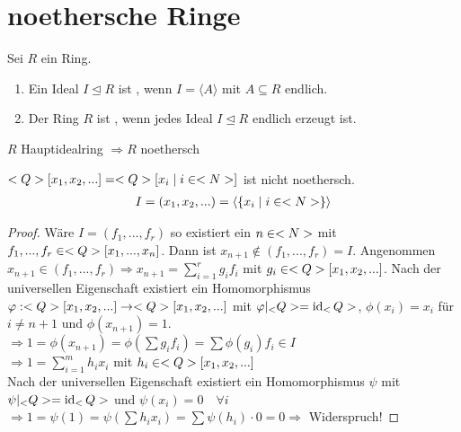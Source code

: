 \section{noethersche Ringe}

Sei $R$ ein Ring.

\begin{definition}
	\begin{enumerate}[label=(\alph*)]
		\item Ein Ideal $I\unlhd R$ ist , wenn $I=\langle A\rangle$ mit $A\subseteq R$ endlich.
		\item Der Ring $R$ ist , wenn jedes Ideal $I\unlhd R$ endlich erzeugt ist.
	\end{enumerate}
\end{definition}

\begin{example}
	$R$ Hauptidealring $\Rightarrow R$ noethersch
\end{example}

\begin{example}
	$<Q>[x_1,x_2,...] = <Q>[x_i\mid i\in<N>]$ ist nicht noethersch.
	\begin{align}
		I = (x_1,x_2,...) = \langle\{x_i\mid i\in<N> \}\rangle\notag
	\end{align}
\end{example}
\begin{proof}
	Wäre $I=(f_1,...,f_r)$ so existiert ein $n\in<N>$ mit $f_1,...,f_r\in<Q>[x_1,...,x_n]$. Dann ist $x_{n+1}\notin (f_1,...,f_r)=I$. Angenommen $x_{n+1}\in (f_1,...,f_r)\Rightarrow x_{n+1}=\sum_{i=1}^{r} g_if_i$ mit $g_i\in<Q>[x_1,x_2,...]$. Nach  der universellen Eigenschaft existiert ein Homomorphismus $\varphi:<Q>[x_1,x_2,...]\to<Q>[x_1,x_2,...]$ mit $\phi\vert_\ratio = \id_\ratio$, $\phi(x_i)=x_i$ für $i\neq n+1$ und $\phi(x_{n+1})=1$. \\
	$\Rightarrow 1 = \phi(x_{n+1}) = \phi(\sum g_if_i) = \sum\phi(g_i)f_i\in I$ \\
	$\Rightarrow 1 = \sum_{i=1}^m h_ix_i$ mit $h_i\in<Q>[x_1,x_2,...]$ \\
	Nach der universellen Eigenschaft existiert ein Homomorphismus $\psi$ mit $\psi\vert_\ratio = \id_\ratio$ und $\psi(x_i) = 0\quad\forall i$ \\
	$\Rightarrow 1 = \psi(1) = \psi(\sum h_ix_i) = \sum\psi(h_i)\cdot 0 = 0\Rightarrow$ Widerspruch!
\end{proof}

